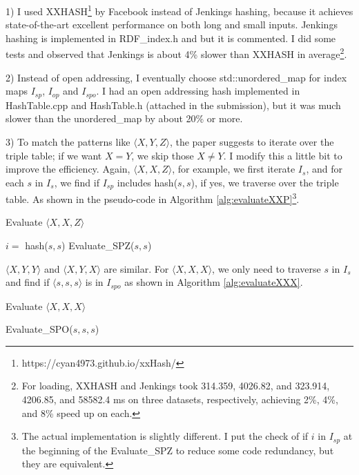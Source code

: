 \documentclass{article}
\begin{document}
\begin{enumerate}
\begin{enumerate}
1) I used XXHASH\footnote{https://cyan4973.github.io/xxHash/} by Facebook instead of Jenkings hashing, because it achieves state-of-the-art excellent performance on both long and small inputs. Jenkings hashing is implemented in RDF\_index.h and but it is commented. I did some tests and observed that Jenkings is about 4\% slower than XXHASH in average\footnote{For loading, XXHASH and Jenkings took 314.359, 4026.82, and 323.914, 4206.85, and 58582.4 ms on three datasets, respectively, achieving 2\%, 4\%, and 8\% speed up on each.}. 

2) Instead of open addressing, I eventually choose std::unordered\_map for index maps $I_{sp}$, $I_{op}$ and $I_{spo}$. I had an open addressing hash implemented in HashTable.cpp and HashTable.h (attached in the submission), but it was much slower than the unordered\_map by about 20\% or more.

3) To match the patterns like $\langle X, Y, Z\rangle$, the paper suggests to iterate over the triple table; if we want $X = Y$,  we skip those $X\neq Y$. I modify this a little bit to improve the efficiency. Again, $\langle X, X, Z\rangle$, for example, we first iterate $I_s$, and for each $s$ in $I_s$, we find if $I_{sp}$ includes hash($s, s$), if yes, we traverse over the triple table. As shown in the pseudo-code in Algorithm \eqref{alg:evaluateXXP}\footnote{The actual implementation is slightly different. I put the check of if $i$ in $I_{sp}$ at the beginning of the Evaluate\_SPZ to reduce some code redundancy, but they are equivalent.}.

\begin{algorithm}[H]
\caption{Evaluate $\langle X, X, Z\rangle$}\label{alg:evaluateXXP}
\begin{algorithmic}
\State $i = $ hash($s, s$)
\State Evaluate\_SPZ($s, s$)
\EndIf
\EndFor
\end{algorithmic}
\end{algorithm}

$\langle X, Y, Y\rangle$ and $\langle X, Y, X\rangle$ are similar. For $\langle X, X, X\rangle$, we only need to traverse  $s$ in $I_s$ and find if $\langle s, s, s\rangle$ is in $I_{spo}$ as shown in  Algorithm \eqref{alg:evaluateXXX}.

\begin{algorithm}[H]
\caption{Evaluate $\langle X, X, X\rangle$}\label{alg:evaluateXXX}
\begin{algorithmic}
\State Evaluate\_SPO($s, s, s$) 
\EndFor
\end{algorithmic}
\end{algorithm}


\end{enumerate}
\end{enumerate}
\end{document}
